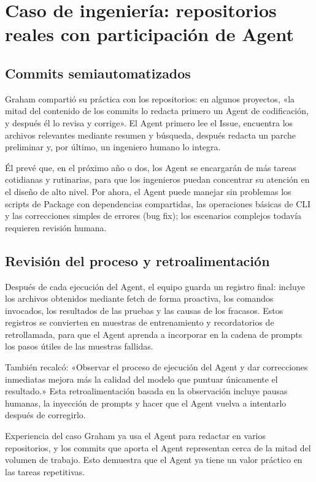 \section{Caso de ingeniería: repositorios reales con participación de Agent}
\subsection{Commits semiautomatizados}
Graham compartió su práctica con los repositorios: en algunos proyectos, «la mitad del contenido de los commits lo redacta primero un Agent de codificación, y después él lo revisa y corrige». El Agent primero lee el Issue, encuentra los archivos relevantes mediante resumen y búsqueda, después redacta un parche preliminar y, por último, un ingeniero humano lo integra.

Él prevé que, en el próximo año o dos, los Agent se encargarán de más tareas cotidianas y rutinarias, para que los ingenieros puedan concentrar su atención en el diseño de alto nivel. Por ahora, el Agent puede manejar sin problemas los scripts de Package con dependencias compartidas, las operaciones básicas de CLI y las correcciones simples de errores (bug fix); los escenarios complejos todavía requieren revisión humana.

\subsection{Revisión del proceso y retroalimentación}
Después de cada ejecución del Agent, el equipo guarda un registro final: incluye los archivos obtenidos mediante fetch de forma proactiva, los comandos invocados, los resultados de las pruebas y las causas de los fracasos. Estos registros se convierten en muestras de entrenamiento y recordatorios de retrollamada, para que el Agent aprenda a incorporar en la cadena de prompts los pasos útiles de las muestras fallidas.

También recalcó: «Observar el proceso de ejecución del Agent y dar correcciones inmediatas mejora más la calidad del modelo que puntuar únicamente el resultado.» Esta retroalimentación basada en la observación incluye pausas humanas, la inyección de prompts y hacer que el Agent vuelva a intentarlo después de corregirlo.

\begin{knowledgebox}{Experiencia del caso}
Graham ya usa el Agent para redactar en varios repositorios, y los commits que aporta el Agent representan cerca de la mitad del volumen de trabajo. Esto demuestra que el Agent ya tiene un valor práctico en las tareas repetitivas.
\end{knowledgebox}

